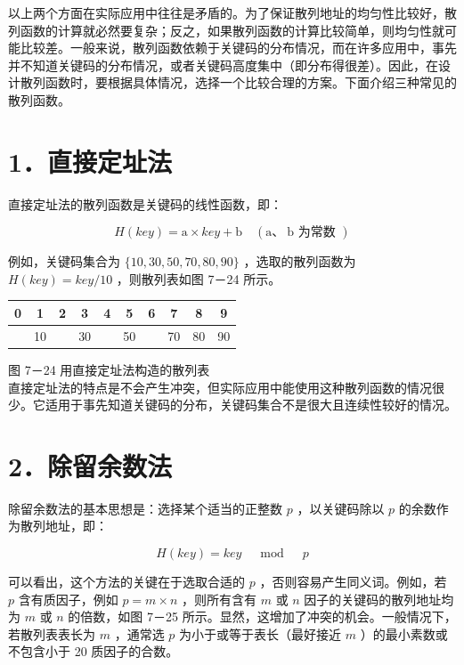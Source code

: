 \documentclass[10pt]{article}
\begin{document}
以上两个方面在实际应用中往往是矛盾的。为了保证散列地址的均匀性比较好，散列函数的计算就必然要复杂；反之，如果散列函数的计算比较简单，则均匀性就可能比较差。一般来说，散列函数依赖于关键码的分布情况，而在许多应用中，事先并不知道关键码的分布情况，或者关键码高度集中（即分布得很差）。因此，在设计散列函数时，要根据具体情况，选择一个比较合理的方案。下面介绍三种常见的散列函数。

\section*{1．直接定址法}
直接定址法的散列函数是关键码的线性函数，即：


\begin{equation*}
H(k e y)=\mathrm{a} \times k e y+\mathrm{b} \quad(\mathrm{a} 、 \mathrm{~b} \text { 为常数 }) \tag{7-2}
\end{equation*}


例如，关键码集合为 $\{10,30,50,70,80,90\}$ ，选取的散列函数为 $H(k e y)=k e y / 10$ ，则散列表如图 7－24 所示。

\begin{center}
\begin{tabular}{|c|c|c|c|c|c|c|c|c|c|}
\hline
0 & 1 & 2 & 3 & 4 & 5 & 6 & 7 & 8 & 9 \\
\hline
 & 10 &  & 30 &  & 50 &  & 70 & 80 & 90 \\
\hline
\end{tabular}
\end{center}

图 7－24 用直接定址法构造的散列表\\
直接定址法的特点是不会产生冲突，但实际应用中能使用这种散列函数的情况很少。它适用于事先知道关键码的分布，关键码集合不是很大且连续性较好的情况。

\section*{2．除留余数法}
除留余数法的基本思想是：选择某个适当的正整数 $p$ ，以关键码除以 $p$ 的余数作为散列地址，即：


\begin{equation*}
H(k e y)=k e y \quad \bmod \quad p \tag{7-3}
\end{equation*}


可以看出，这个方法的关键在于选取合适的 $p$ ，否则容易产生同义词。例如，若 $p$ 含有质因子，例如 $p=m \times n$ ，则所有含有 $m$ 或 $n$ 因子的关键码的散列地址均为 $m$ 或 $n$ 的倍数，如图 7－25 所示。显然，这增加了冲突的机会。一般情况下，若散列表表长为 $m$ ，通常选 $p$ 为小于或等于表长（最好接近 $m$ ）的最小素数或不包含小于 20 质因子的合数。
\end{document}
